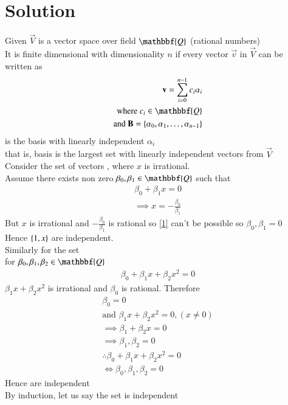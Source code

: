 \documentclass[journal,12pt,twocolumn]{IEEEtran}
\begin{document}
\section{Solution}
Given $\vec{V}$ is a vector space over field $\mathbbf{Q}$ (rational numbers)\\
It is finite dimensional with dimensionality $n$ if every vector $\vec{v}$ in $\vec{V}$ can be written as
\begin{align}
    \vec{v}=\sum_{i=0}^{n-1} c_i\alpha_i\\
    \text{where }c_i \in \mathbbf{Q}\\
    \text{and } \vec{B}= \cbrak{\alpha_0,\alpha_1,\hdots,\alpha_{n-1} }
\end{align}
is the basis with linearly independent $\alpha_i$\\
that is, basis is the largest set with linearly independent vectors from $\vec{V}$\\
Consider the set of vectors  , where $x$ is irrational.\\
Assume there exists non zero $\beta_0,\beta_1 \in \mathbbf{Q}$ such that
\begin{align}
   \beta_0+\beta_1x=0 \\
   \implies x=-\frac{\beta_0}{\beta_1}\label{1}
\end{align}
But $x$ is irrational and $-\frac{\beta_0}{\beta_1}$ is rational so \eqref{1} can't be possible so $\beta_0,\beta_1=0$\\
Hence $\left\{1,x\right\}$ are independent.\\
Similarly for the set  \\
for  $\beta_0,\beta_1,\beta_2 \in \mathbbf{Q}$
\begin{align}
  \beta_0+\beta_1x+\beta_2x^2=0  
\end{align}
$\beta_1x+\beta_2x^2$ is irrational and $\beta_0$ is rational. Therefore
\begin{align}
  \beta_0=0\label{2}\\
  \text{and  } \beta_1x+\beta_2x^2=0,( x \neq 0)\label{3}\\
  \implies \beta_1+\beta_2x=0  \\
  \implies \beta_1,\beta_2=0\\
  \therefore  \beta_0+\beta_1x+\beta_2x^2=0\\ \iff \beta_0,\beta_1,\beta_2=0
\end{align}
Hence  are independent \\
By induction, let us say the set  is independent
\end{document}
